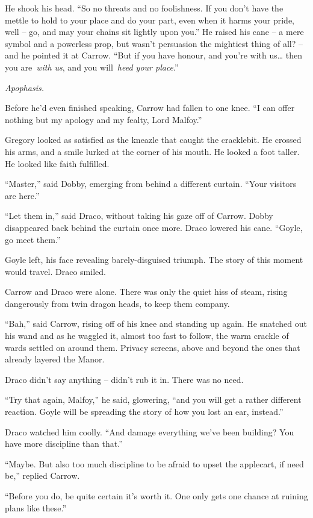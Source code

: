 He shook his head. ``So no threats and no foolishness. If you don't have
the mettle to hold to your place and do your part, even when it harms
your pride, well -- go, and may your chains sit lightly upon you.'' He
raised his cane -- a mere symbol and a powerless prop, but wasn't
persuasion the mightiest thing of all? -- and he pointed it at Carrow.
``But if you have honour, and you're with us\ldots{} then you
are~\emph{with us}, and you will~\emph{heed your place}.''

\emph{Apophasis.}

Before he'd even finished speaking, Carrow had fallen to one knee. ``I
can offer nothing but my apology and my fealty, Lord Malfoy.''

Gregory looked as satisfied as the kneazle that caught the cracklebit.
He crossed his arms, and a smile lurked at the corner of his mouth. He
looked a foot taller. He looked like faith fulfilled.

``Master,'' said Dobby, emerging from behind a different curtain. ``Your
visitors are here.''

``Let them in,'' said Draco, without taking his gaze off of Carrow.
Dobby disappeared back behind the curtain once more. Draco lowered his
cane. ``Goyle, go meet them.''

Goyle left, his face revealing barely-disguised triumph. The story of
this moment would travel. Draco smiled.

Carrow and Draco were alone. There was only the quiet hiss of steam,
rising dangerously from twin dragon heads, to keep them company.

``Bah,'' said Carrow, rising off of his knee and standing up again. He
snatched out his wand and as he waggled it, almost too fast to follow,
the warm crackle of wards settled on around them. Privacy screens, above
and beyond the ones that already layered the Manor.

Draco didn't say anything -- didn't rub it in. There was no need.

``Try that again, Malfoy,'' he said, glowering, ``and you will get a
rather different reaction. Goyle will be spreading the story of how you
lost an ear, instead.''

Draco watched him coolly. ``And damage everything we've been building?
You have more discipline than that.''

``Maybe. But also too much discipline to be afraid to upset the
applecart, if need be,'' replied Carrow.

``Before you do, be quite certain it's worth it. One only gets one
chance at ruining plans like these.''

